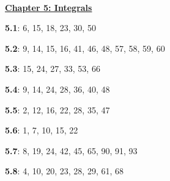 \documentclass{siproblemset}
\begin{document}
\begin{multicols*}{2}
        \ \linebreak
        
        \underline{\textbf{Chapter 5: Integrals}}
        
        \textbf{5.1}: 6, 15, 18, 23, 30, 50
        
        \textbf{5.2}: 9, 14, 15, 16, 41, 46, 48, 57, 58, 59, 60
        
        \textbf{5.3}: 15, 24, 27, 33, 53, 66
        
        \textbf{5.4}: 9, 14, 24, 28, 36, 40, 48
        
        \textbf{5.5}: 2, 12, 16, 22, 28, 35, 47
        
        \textbf{5.6}: 1, 7, 10, 15, 22
        
        \textbf{5.7}: 8, 19, 24, 42, 45, 65, 90, 91, 93
        
        \textbf{5.8}: 4, 10, 20, 23, 28, 29, 61, 68
    \end{multicols*}
    
\end{document}
